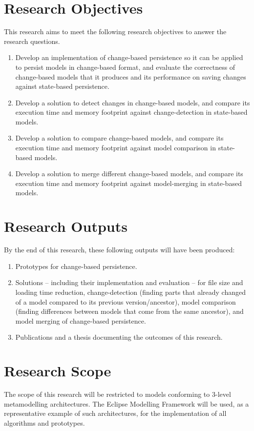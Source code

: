 \section{Research Objectives}
\label{sec:research_objectives}
This research aims to meet the following research objectives to answer the research questions.
\begin{enumerate}
\item Develop an implementation of change-based persistence so it can be applied to persist models in change-based format, and evaluate the correctness of change-based models that it produces and its performance on saving changes against state-based persistence. 
\item Develop a solution to detect changes in change-based models, and compare its execution time and memory footprint against change-detection in state-based models.
\item Develop a solution to compare change-based models, and compare its execution time and memory footprint against model comparison in state-based models.
\item Develop a solution to merge different change-based models, and compare its execution time and memory footprint against model-merging in state-based models. 
\end{enumerate}

\section{Research Outputs}
\label{sec:research_outputs}
By the end of this research, these following outputs will have been produced:
\begin{enumerate}
\item Prototypes for change-based persistence. 
\item Solutions -- including their implementation and evaluation -- for file size and loading time reduction, change-detection (finding parts that already changed of a model compared to its previous version/ancestor), model comparison (finding differences between models that come from the same ancestor), and model merging of change-based persistence.
\item Publications and a thesis documenting the outcomes of this research.
\end{enumerate}


\section{Research Scope}
\label{sec:research_scope}
The scope of this research will be restricted to models conforming to 3-level metamodelling architectures. The Eclipse Modelling Framework will be used, as a representative example of such architectures, for the implementation of all algorithms and prototypes.

